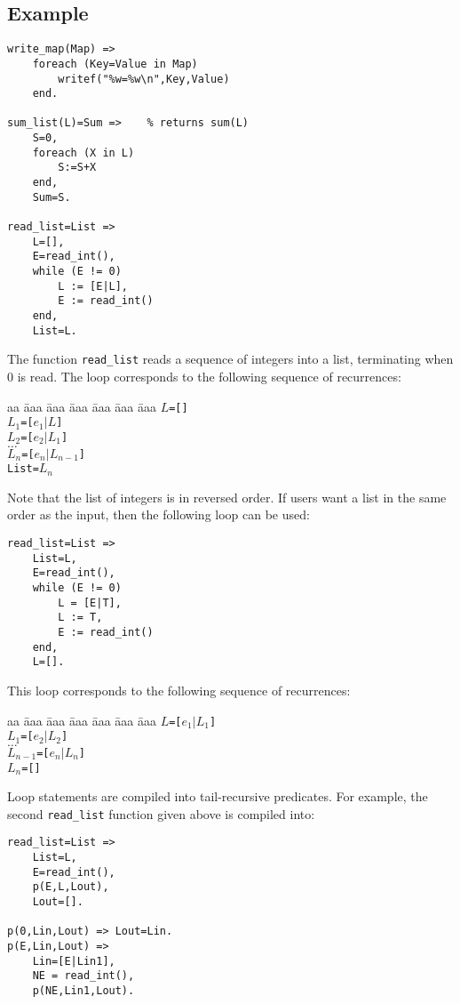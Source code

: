 \subsection*{Example}
\begin{verbatim}
write_map(Map) =>
    foreach (Key=Value in Map)
        writef("%w=%w\n",Key,Value)
    end.

sum_list(L)=Sum =>    % returns sum(L)
    S=0,
    foreach (X in L)
        S:=S+X
    end,
    Sum=S.

read_list=List =>
    L=[],
    E=read_int(),
    while (E != 0) 
        L := [E|L],
        E := read_int()
    end,
    List=L.
\end{verbatim}
The function \texttt{read\_list} reads a sequence of integers into a list, terminating when 0 is read. The loop corresponds to the following sequence of recurrences:
\begin{tabbing}
aa \= aaa \= aaa \= aaa \= aaa \= aaa \= aaa \kill
\> \texttt{$L$=[]} \\
\> \texttt{$L_1$=[$e_1$$|$$L$]} \\
\> \texttt{$L_2$=[$e_2$$|$$L_1$]} \\
\> $\ldots$ \\
\> \texttt{$L_n$=[$e_n$$|$$L_{n-1}$]} \\
\> \texttt{List=$L_n$}
\end{tabbing}
Note that the list of integers is in reversed order. If users want a list in the same order as the input, then the following loop can be used:
\begin{verbatim}
read_list=List =>
    List=L,
    E=read_int(),
    while (E != 0) 
        L = [E|T],
        L := T,
        E := read_int()
    end,
    L=[].
\end{verbatim}
This loop corresponds to the following sequence of recurrences:
\begin{tabbing}
aa \= aaa \= aaa \= aaa \= aaa \= aaa \= aaa \kill
\> \texttt{$L$=[$e_1$$|$$L_1$]} \\
\> \texttt{$L_1$=[$e_2$$|$$L_2$]} \\
\> $\ldots$ \\
\> \texttt{$L_{n-1}$=[$e_n$$|$$L_{n}$]} \\
\> \texttt{$L_n$=[]}
\end{tabbing}
Loop statements are compiled into tail-recursive predicates. For example, the second \texttt{read\_list} function given above is compiled into:
\begin{verbatim}
read_list=List =>
    List=L,
    E=read_int(),
    p(E,L,Lout),
    Lout=[].

p(0,Lin,Lout) => Lout=Lin.
p(E,Lin,Lout) => 
    Lin=[E|Lin1],
    NE = read_int(),
    p(NE,Lin1,Lout).
\end{verbatim}

